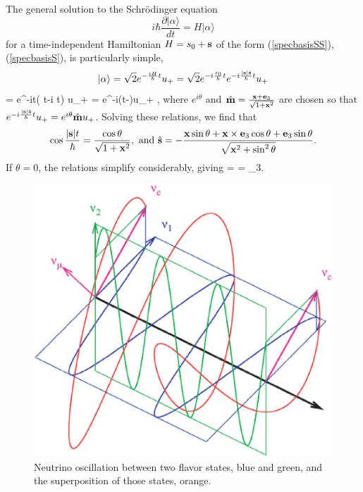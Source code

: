 \documentclass[]{article}
\begin{document}
                           
 The general solution to the Schr\"odinger equation   
 \[  i\hbar \frac{\partial |\alpha\rangle}{dt} = H |\alpha \rangle \]
 for a time-independent Hamiltonian $H=s_0 + \mathbf{s}$ of the form (\ref{specbasisSS}), (\ref{specbasisS}), 
is particularly simple,
 \[ | \alpha \rangle = \sqrt 2 e^{-\frac{iH}{\hbar}t}u_+= \sqrt 2 e^{-i\frac{s_0}{\hbar}t}e^{-i\frac{|\mathbf{s}|\hat {\mathbf{s}}}{\hbar} t}u_+ \]
   \beq  =  e^{-it}(\cos\frac{|\bs|}{\hbar} t-i \hat \bs \sin \frac{|\bs|}{\hbar} t) u_+
      = e^{-i(t-\theta)}\hat \bm u_+ , \label{solnschrodinger} \eeq
where $e^{i \theta}$ and $\hat {\mathbf{m}}=\frac{\mathbf{x} + \mathbf{e}_3}{\sqrt{1+\mathbf{x}^2}}$ are chosen so that $e^{-i\frac{|\mathbf{s}|\hat {\mathbf{s}}}{\hbar} t}u_+=e^{i \theta}\hat {\mathbf{m}} u_+$. Solving these relations, we find that
\[ \cos\frac{|\bs|t}{\hbar} = \frac{\cos \theta}{\sqrt{1+\bx^2}}, \  {\rm and} \ 
\hat \bs = -\frac{\bx \sin \theta + \bx \times \be_3 \cos \theta + \be_3 \sin \theta}{\sqrt{\bx^2 + \sin^2\theta} }.\]
If $\theta=0$, the relations simplify considerably, giving
\beq \cos {} =  \quad \hat \bs = \be_3\times \hat \bx .
          \label{neutrinosimple} \eeq
  \begin{figure}
\begin{center}
\no\includegraphics[scale=.30]{oscillations3d.eps}
\caption{Neutrino oscillation between two flavor states, blue and green, and the superposition of
those states, orange.}
\label{fleurotpic}
\end{center}
\end{figure}
\end{document}
